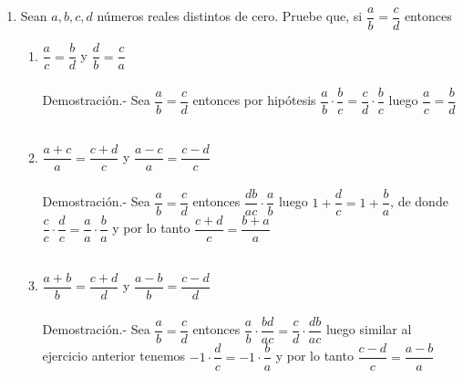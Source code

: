 \documentclass[10pt]{article}
\begin{document}
\begin{enumerate}
	\item Sean $a,b,c,d$ números reales distintos de cero. Pruebe que, si $\dfrac{a}{b}=\dfrac{c}{d}$ entonces
	\begin{enumerate}[\bfseries a)]
	    \item $\dfrac{a}{c}=\dfrac{b}{d}$ y $\dfrac{d}{b}=\dfrac{c}{a}$\\\\
	    Demostración.-\; Sea $\dfrac{a}{b}=\dfrac{c}{d}$ entonces por hipótesis $\dfrac{a}{b}\cdot \dfrac{b}{c}=\dfrac{c}{d} \cdot \dfrac{b}{c}$ luego $\dfrac{a}{c}=\dfrac{b}{d}$\\\\ 

	    \item $\dfrac{a+c}{a}=\dfrac{c+d}{c}$ y $\dfrac{a-c}{a}=\dfrac{c-d}{c}$\\\\
	    Demostración.-\; Sea $\dfrac{a}{b}=\dfrac{c}{d}$ entonces $\dfrac{db}{ac}\cdot \dfrac{a}{b}$ luego $1+\dfrac{d}{c}=1+\dfrac{b}{a}$, de donde $\dfrac{c}{c}\cdot \dfrac{d}{c}=\dfrac{a}{a}\cdot \dfrac{b}{a}$ y por lo tanto $\dfrac{c+d}{c}=\dfrac{b+a}{a}$\\\\

	    \item $\dfrac{a+b}{b}=\dfrac{c+d}{d}$ y $\dfrac{a-b}{b}=\dfrac{c-d}{d}$\\\\
	    Demostración.-\; Sea $\dfrac{a}{b}=\dfrac{c}{d}$ entonces $\dfrac{a}{b}\cdot \dfrac{bd}{ac}=\dfrac{c}{d}\cdot \dfrac{db}{ac}$ luego similar al ejercicio anterior tenemos $-1 \cdot \dfrac{d}{c}=-1 \cdot \dfrac{b}{a}$ y por lo tanto $\dfrac{c-d}{c}=\dfrac{a-b}{a}$\\\\

	\end{enumerate}


\end{enumerate}
\end{document}
